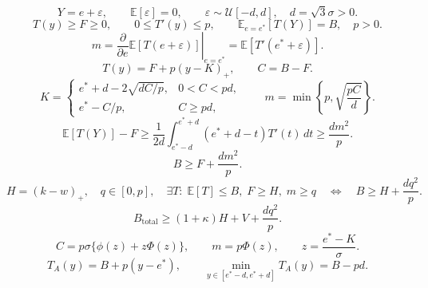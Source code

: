 \[
Y=e+\varepsilon,\qquad \mathbb{E}[\varepsilon]=0,\qquad
\varepsilon\sim\mathcal{U}[-d,d],\quad d=\sqrt{3}\sigma>0.
\tag{1}
\]
\[
T(y)\geq F\geq0,\qquad 0\leq T'(y)\leq p,\qquad
\mathbb{E}_{e=e^{*}}[T(Y)]=B,\quad p>0.
\tag{2}
\]
\[
m=\left.\frac{\partial}{\partial e}\mathbb{E}[T(e+\varepsilon)]\right|_{e=e^{*}}
=\mathbb{E}[T'(e^{*}+\varepsilon)].
\tag{3}
\]
\[
T(y)=F+p(y-K)_{+},\qquad C=B-F.
\tag{4}
\]
\[
K=\begin{cases}
e^{*}+d-2\sqrt{dC/p},&0<C<pd,\\
e^{*}-C/p,&C\geq pd,
\end{cases}\qquad
m=\min\!\left\{p,\sqrt{\frac{pC}{d}}\right\}.
\tag{5}
\]
\[
\mathbb{E}[T(Y)]-F
\geq\frac{1}{2d}\int_{e^{*}-d}^{e^{*}+d}(e^{*}+d-t)T'(t)\,dt
\geq\frac{dm^{2}}{p}.
\tag{6}
\]
\[
B\geq F+\frac{dm^{2}}{p}.
\tag{7}
\]
\[
H=(k-w)_{+},\quad q\in[0,p],\quad\exists T:\;\mathbb{E}[T]\leq B,\;F\geq H,\;m\geq q
\quad\Longleftrightarrow\quad B\geq H+\frac{dq^{2}}{p}.
\tag{8}
\]
\[
B_{\mathrm{total}}\geq(1+\kappa)H+V+\frac{dq^{2}}{p}.
\tag{9}
\]
\[
C=p\sigma\{\phi(z)+z\Phi(z)\},\qquad
m=p\Phi(z),\qquad z=\frac{e^{*}-K}{\sigma}.
\tag{10}
\]
\[
T_{A}(y)=B+p(y-e^{*}),\qquad \min_{y\in[e^{*}-d,e^{*}+d]}T_A(y)=B-pd.
\tag{11}
\]
